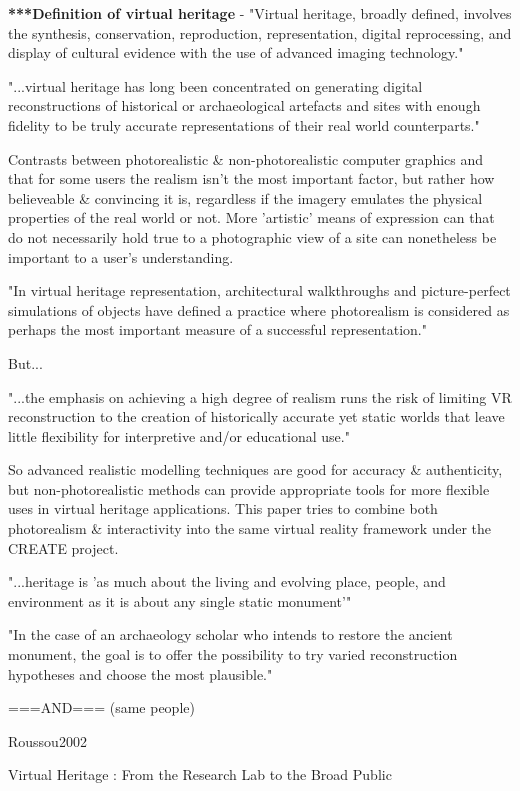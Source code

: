 \textbf{***Definition of virtual heritage} - "Virtual heritage, broadly defined, involves the synthesis, conservation,
reproduction, representation, digital reprocessing, and display of cultural evidence with the use of
advanced imaging technology."
        
"...virtual heritage has long been concentrated on generating digital reconstructions of historical or
archaeological artefacts and sites with enough fidelity to be truly accurate representations of their real
world counterparts."
        
Contrasts between photorealistic \& non-photorealistic computer graphics and that for some users the realism
isn't the most important factor, but rather how believeable \& convincing it is, regardless if the imagery
emulates the physical properties of the real world or not. More 'artistic' means of expression can that do
not necessarily hold true to a photographic view of a site can nonetheless be important to a user's understanding.
        
"In virtual heritage representation, architectural walkthroughs and picture-perfect simulations of objects
have defined a practice where photorealism is considered as perhaps the most important measure of a
successful representation."
        
But...
        
"...the emphasis on achieving a high degree of realism runs the risk of limiting VR reconstruction to the
creation of historically accurate yet static worlds that leave little flexibility for interpretive and/or
educational use."
        
So advanced realistic modelling techniques are good for accuracy \& authenticity, but non-photorealistic methods
can provide appropriate tools for more flexible uses in virtual heritage applications. This paper tries to
combine both photorealism \& interactivity into the same virtual reality framework under the CREATE project.
        
"...heritage is 'as much about the living and evolving place, people, and environment as it is about any
single static monument'"
        
"In the case of an archaeology scholar who intends to restore the ancient monument, the goal is to offer
the possibility to try varied reconstruction hypotheses and choose the most plausible."

===AND=== (same people)

Roussou2002

Virtual Heritage : From the Research Lab to the Broad Public

